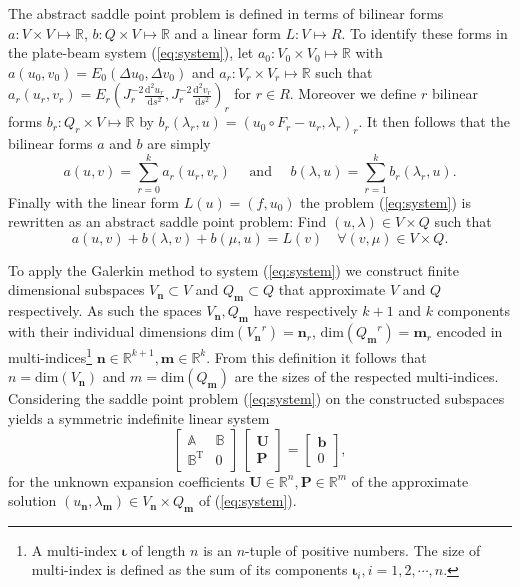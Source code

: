 \documentclass{marine_2015}
\newcommand{\Uvec}{\ensuremath{\mathbf{U}}}
\newcommand{\Pvec}{\ensuremath{\mathbf{P}}}
\newcommand{\inner}[2]{\ensuremath{\left(#1, #2\right)}}
\newcommand{\rinner}[2]{\ensuremath{\left(#1, #2\right)_r}}
\newcommand{\ainner}[2]{\ensuremath{a\left(#1, #2\right)}}
\newcommand{\arinner}[2]{\ensuremath{a_r\left(#1, #2\right)}}
\newcommand{\binner}[2]{\ensuremath{b\left(#1, #2\right)}}
\newcommand{\brinner}[2]{\ensuremath{b_r\left(#1, #2\right)}}
\newcommand{\Linner}[1]{\ensuremath{L\left(#1\right)}}
\newcommand{\Vh}{\ensuremath{V_{\mathbf{n}}}}
\newcommand{\Qh}{\ensuremath{Q_{\mathbf{m}}}}
\newcommand{\tderiv}[2]{\ensuremath{\tfrac{\mathrm{d}#1}{\mathrm{d}#2}}}
\begin{document}
The abstract saddle point problem is defined in terms of bilinear forms $a:V\times V\mapsto \mathbb{R}$,
$b:Q\times V\mapsto \mathbb{R}$ and a linear form $L:V\mapsto R$. To identify these 
forms in the plate-beam system (\ref{eq:system}), let $a_0:V_0\times V_0\mapsto
\mathbb{R}$ with $\ainner{u_0}{v_0}=E_0\inner{\Delta u_0}{\Delta v_0}$ and
$a_r:V_r\times V_r\mapsto \mathbb{R}$ such that $\arinner{u_r}{v_r}=E_r\rinner{J_r^{-2}\tderiv{^2 u_r}{s^2}}{J_r^{-2}\tderiv{^2
v_r}{s^2}}$ for $r\in R$. Moreover we define $r$ bilinear forms
$b_r:Q_r\times V\mapsto\mathbb{R}$ by
$\brinner{\lambda_r}{u}=\rinner{u_0\circ F_r-u_r}{\lambda_r}$. It then follows 
that the bilinear forms $a$ and $b$ are simply
\[
  \ainner{u}{v} = \displaystyle\sum_{r=0}^{k}\arinner{u_r}{v_r}\quad\text{ and
  }\quad\binner{\lambda}{u} = \displaystyle\sum_{r=1}^{k}\brinner{\lambda_r}{u}.
\]
Finally with the linear form $\Linner{u}=\inner{f}{u_0}$ the problem
(\ref{eq:system}) is rewritten as an abstract saddle point problem: Find
$\left(u, \lambda\right)\in V\times Q$ such that
\[
  \ainner{u}{v} + \binner{\lambda}{v} + \binner{\mu}{u} = \Linner{v}\quad\forall
  \left(v, \mu\right)\in V\times Q.
\]

To apply the Galerkin method to system (\ref{eq:system}) we construct finite dimensional
subspaces $\Vh\subset V$ and $\Qh\subset Q$ that approximate $V$ and $Q$
respectively. As such the spaces $\Vh, \Qh$ have respectively $k+1$ and $k$
components with their individual dimensions
$\text{dim}\left(\Vh^r\right)=\mathbf{n}_r$, $\text{dim}\left(\Qh^r\right)=\mathbf{m}_r$ 
encoded in multi-indices\footnote{A multi-index $\mathbf{\iota}$ of length $n$
is an $n$-tuple of positive numbers. The size of multi-index is defined as the
sum of its components $\mathbf{\iota}_i, i=1, 2, \cdots, n$.} $\mathbf{n}\in\mathbb{R}^{k+1}, \mathbf{m}\in\mathbb{R}^k$.
From this definition it follows that $n=\text{dim}\left(\Vh\right)$ and $m=\text{dim}\left(\Qh\right)$
are the sizes of the respected multi-indices. Considering the saddle point
problem (\ref{eq:system}) on the constructed subspaces yields a symmetric
indefinite linear system
\begin{equation}
  \label{eq:sysAB}
    \begin{bmatrix}
      \mathbb{A} & \mathbb{B} \\
      \mathbb{B}^{\text{T}} & 0
    \end{bmatrix}
    \,
    \begin{bmatrix}
      \mathbf{U} \\
      \mathbf{P}
    \end{bmatrix}
    =
    \begin{bmatrix}
      \mathbf{b}\\
      0
    \end{bmatrix},
\end{equation}
for the unknown expansion coefficients $\Uvec\in\mathbb{R}^n,
\Pvec\in\mathbb{R}^m$ of the approximate solution
$\left(u_\mathbf{n}, \lambda_{\mathbf{m}}\right)\in \Vh \times \Qh$ of
(\ref{eq:system}).
\end{document}
